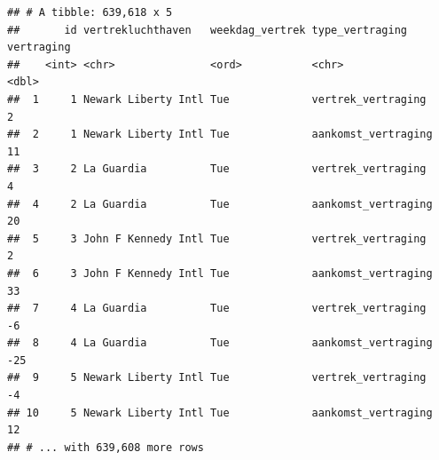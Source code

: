 \documentclass[]{tufte-book}
\newenvironment{Shaded}{}{}
\newcommand{\DataTypeTok}[1]{\textcolor[rgb]{0.56,0.13,0.00}{#1}}
\newcommand{\KeywordTok}[1]{\textcolor[rgb]{0.00,0.44,0.13}{\textbf{#1}}}
\newcommand{\NormalTok}[1]{#1}
\newcommand{\OperatorTok}[1]{\textcolor[rgb]{0.40,0.40,0.40}{#1}}
\newcommand{\StringTok}[1]{\textcolor[rgb]{0.25,0.44,0.63}{#1}}
\begin{document}
\begin{Shaded}
\end{Shaded}

\begin{verbatim}
## # A tibble: 639,618 x 5
##       id vertrekluchthaven   weekdag_vertrek type_vertraging     vertraging
##    <int> <chr>               <ord>           <chr>                    <dbl>
##  1     1 Newark Liberty Intl Tue             vertrek_vertraging           2
##  2     1 Newark Liberty Intl Tue             aankomst_vertraging         11
##  3     2 La Guardia          Tue             vertrek_vertraging           4
##  4     2 La Guardia          Tue             aankomst_vertraging         20
##  5     3 John F Kennedy Intl Tue             vertrek_vertraging           2
##  6     3 John F Kennedy Intl Tue             aankomst_vertraging         33
##  7     4 La Guardia          Tue             vertrek_vertraging          -6
##  8     4 La Guardia          Tue             aankomst_vertraging        -25
##  9     5 Newark Liberty Intl Tue             vertrek_vertraging          -4
## 10     5 Newark Liberty Intl Tue             aankomst_vertraging         12
## # ... with 639,608 more rows
\end{verbatim}
\end{document}

